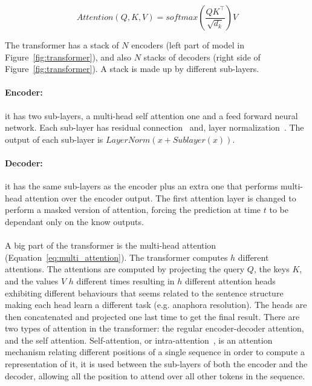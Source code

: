 \begin{equation}
    Attention\left(Q, K, V\right) = softmax\left(\frac{QK^\intercal}{\sqrt{d_k}}\right)V
    \label{eq:dot-attention}
\end{equation}

The transformer has a stack of $N$ encoders (left part of model in Figure~\ref{fig:transformer}), and also $N$ stacks of decoders (right side of Figure~\ref{fig:transformer}). A stack is made up by different sub-layers. 

\paragraph{Encoder:} it has two sub-layers, a multi-head self attention one and a feed forward neural network. Each sub-layer has residual connection~\citep{he2016residual} and, layer normalization~\citep{lei2016normalization}. The output of each sub-layer is $LayerNorm(x + Sublayer(x))$.

\paragraph{Decoder:} it has the same sub-layers as the encoder plus an extra one that performs multi-head attention over the encoder output. The first attention layer is changed to perform a masked version of attention, forcing the prediction at time $t$ to be dependant only on the know outputs.

\paragraph{}
A big part of the transformer is the multi-head attention (Equation~\ref{eq:multi_attention}). The transformer computes $h$ different attentions. The attentions are computed by projecting the query $Q$, the keys $K$, and the values $V$ $h$ different times resulting in $h$ different attention heads exhibiting different behaviours that seems related to the sentence  structure making each head learn a different task (e.g. anaphora resolution). The heads are then concatenated and projected one last time to get the final result. There are two types of attention in the transformer: the regular encoder-decoder attention, and the self attention. Self-attention, or intra-attention~\citep{cheng-etal-2016-long}, is an attention mechanism relating different positions of a single sequence in order to compute a representation of it, it is used between the sub-layers of both the encoder and the decoder, allowing all the position to attend over all other tokens in the sequence. 

